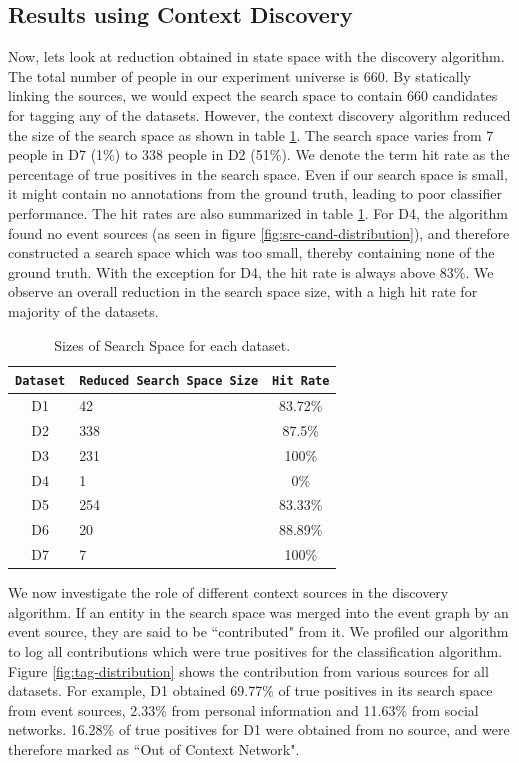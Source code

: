 \subsection{Results using Context Discovery}
Now, lets look at reduction obtained in state space with the discovery algorithm. The total number of people in our experiment universe is 660. By statically linking the sources, we would expect the search space to contain 660 candidates for tagging any of the datasets. However, the context discovery algorithm reduced the size of the search space as shown in table \ref{tbl:search-spaces}. The search space varies from 7 people in D7 (1\%) to 338 people in D2 (51\%). We denote the term hit rate as the percentage of true positives in the search space. Even if our search space is small, it might contain no annotations from the ground truth, leading to poor classifier performance. The hit rates are also summarized in table \ref{tbl:search-spaces}. For D4, the algorithm found no event sources (as seen in figure \ref{fig:src-cand-distribution}), and therefore constructed a search space which was too small, thereby containing none of the ground truth. With the exception for D4, the hit rate is always above 83\%. We observe an overall reduction in the search space size, with a high hit rate for majority of the datasets. 

\begin{table}[h]
\begin{center}
\begin{tabular}{ |c|p{2.5cm}|c| }
  \hline
  \texttt{Dataset} & \texttt{Reduced Search Space Size} & \texttt{Hit Rate}\\
  \hline
  D1 & 42 & 83.72\%\\
  D2 & 338 & 87.5\%\\
  D3 & 231 & 100\%\\
  D4 & 1 & 0\%\\
  D5 & 254 & 83.33\%\\
  D6 & 20 & 88.89\%\\
  D7 & 7 & 100\%\\
  \hline
\end{tabular}
\caption{Sizes of Search Space for each dataset.}
\label{tbl:search-spaces}
\end{center}
\end{table}

We now investigate the role of different context sources in the discovery algorithm. If an entity in the search space was merged into the event graph by an event source, they are said to be ``contributed" from it. We profiled our algorithm to log all contributions which were true positives for the classification algorithm. Figure \ref{fig:tag-distribution} shows the contribution from various sources for all datasets. For example, D1 obtained 69.77\% of true positives in its search space from event sources, 2.33\% from personal information and 11.63\% from social networks. 16.28\% of true positives for D1 were obtained from no source, and were therefore marked as ``Out of Context Network". 

